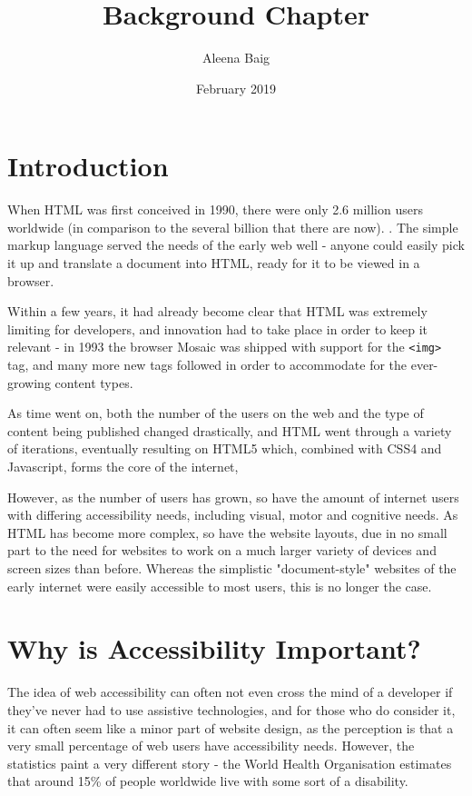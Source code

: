 \documentclass{article}
\title{Background Chapter}
\author{Aleena Baig}
\date{February 2019}
\begin{document}
\maketitle

\tableofcontents

\newpage

\section{Introduction}
When HTML was first conceived in 1990, there were only 2.6 million users worldwide (in comparison to the several billion that there are now). \cite{ourworldindata:internet}. The simple markup language served the needs of the early web well - anyone could easily pick it up and translate a document into HTML, ready for it to be viewed in a browser.

Within a few years, it had already become clear that HTML was extremely limiting for developers, and innovation had to take place in order to keep it relevant - in 1993 the browser Mosaic was shipped with support for the \texttt{<img>} tag, and many more new tags followed in order to accommodate for the ever-growing content types. \cite{historyofhtml}

As time went on, both the number of the users on the web and the type of content being published changed drastically, and HTML went through a variety of iterations, eventually resulting on HTML5 which, combined with CSS4 and Javascript, forms the core of the internet,

However, as the number of users has grown, so have the amount of internet users with differing accessibility needs, including visual, motor and cognitive needs. As HTML has become more complex, so have the website layouts, due in no small part to the need for websites to work on a much larger variety of devices and screen sizes than before. Whereas the simplistic "document-style" websites of the early internet were easily accessible to most users, this is no longer the case.


\section{Why is Accessibility Important?}

The idea of web accessibility can often not even cross the mind of a developer if they've never had to use assistive technologies, and for those who do consider it, it can often seem like a minor part of website design, as the perception is that a very small percentage of web users have accessibility needs. However, the statistics paint a very different story - the World Health Organisation estimates that around 15\% of people worldwide live with some sort of a disability. \cite{WHOdisability}
\end{document}

